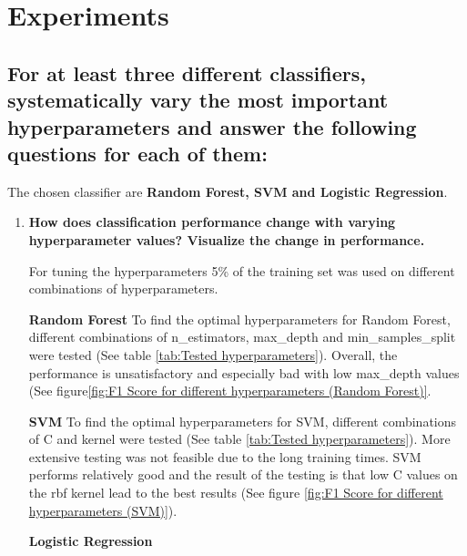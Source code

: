 
\section{Experiments}
\label{sec:Experiments}






\subsection{For at least three different classifiers, systematically vary the most important hyperparameters and answer the following questions for each of them: }
\label{sec:Experiments:a}

The chosen classifier are \textbf{Random Forest, SVM and Logistic Regression}.

\begin{enumerate}[label=\roman*.)]
\item \textbf{How does classification performance change with varying hyperparameter values? Visualize the
change in performance.}

For tuning the hyperparameters 5\% of the training set was used on different combinations of hyperparameters.

\textbf{Random Forest} \quad
To find the optimal hyperparameters for Random Forest, different combinations of n\_estimators, max\_depth and min\_samples\_split were tested (See table \ref{tab:Tested hyperparameters}). Overall, the performance is  unsatisfactory and especially bad with low max\_depth values (See figure\ref{fig:F1 Score for different hyperparameters (Random Forest)}.

\textbf{SVM} \quad
To find the optimal hyperparameters for SVM, different combinations of C and kernel  were tested (See table \ref{tab:Tested hyperparameters}). More extensive testing was not feasible due to the long training times. SVM performs relatively good and the result of the testing is that low C values on the rbf kernel lead to the best results (See figure \ref{fig:F1 Score for different hyperparameters (SVM)}).


\textbf{Logistic Regression} \quad


\end{enumerate}
